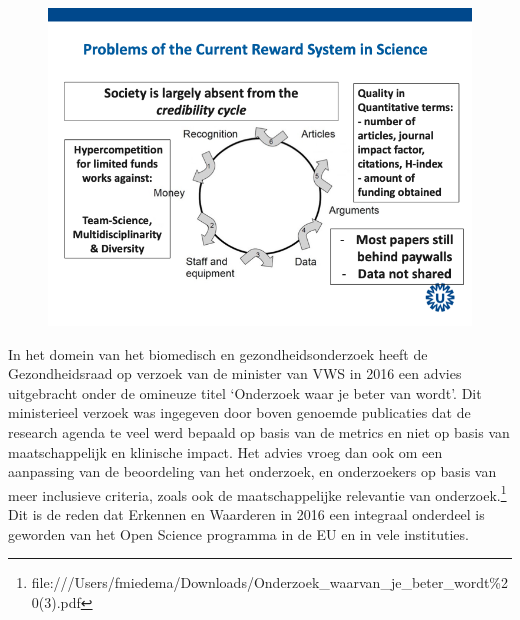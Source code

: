 \documentclass{jote-book}
\begin{document}
	\begin{figure}
		\includegraphics[width=\linewidth]{media/image3.png}

		\caption{}

		\label{fig:rId18}


	\end{figure}



	In het domein van het biomedisch en gezondheidsonderzoek heeft de Gezondheidsraad op verzoek van de minister van VWS in 2016 een advies uitgebracht onder de omineuze titel ‘Onderzoek waar je beter van wordt'. Dit ministerieel verzoek was ingegeven door boven genoemde publicaties dat de research agenda te veel werd bepaald op basis van de metrics en niet op basis van maatschappelijk en klinische impact. Het advies vroeg dan ook om een aanpassing van de beoordeling van het onderzoek, en onderzoekers op basis van meer inclusieve criteria, zoals ook de maatschappelijke relevantie van onderzoek.\footnote{file:///Users/fmiedema/Downloads/Onderzoek\_waarvan\_je\_beter\_wordt\%20(3).pdf} Dit is de reden dat Erkennen en Waarderen in 2016 een integraal onderdeel is geworden van het Open Science programma in de EU en in vele instituties.
\end{document}

